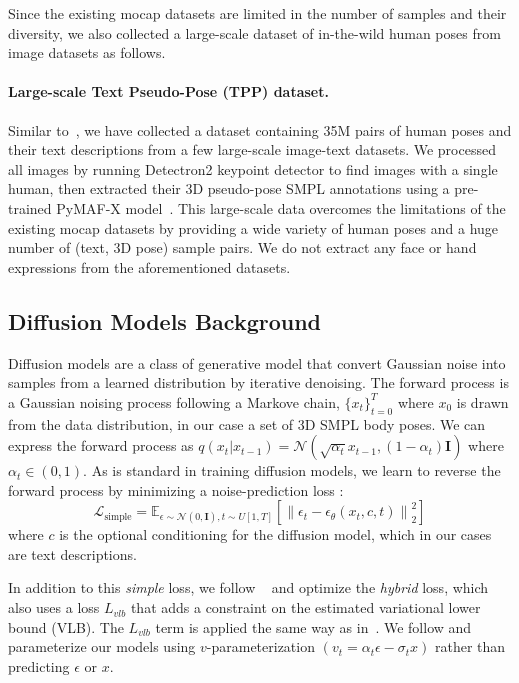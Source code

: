 \documentclass[10pt,twocolumn,letterpaper]{article}
\begin{document}
Since the existing mocap datasets are limited in the number of samples and their diversity, we also collected a large-scale dataset of in-the-wild human poses from image datasets as follows. 
\paragraph{Large-scale Text Pseudo-Pose (TPP) dataset.} Similar to~\cite{azadi2023text}, we have collected a dataset containing 35M pairs of human poses and their text descriptions from a few large-scale image-text datasets. We processed all images by running Detectron2 keypoint detector to find images with a single human, then extracted their 3D pseudo-pose SMPL annotations using a
pre-trained PyMAF-X model~\cite{pymafx}. This large-scale data overcomes the limitations of the existing mocap datasets by
providing a wide variety of human poses and a huge number of
(text, 3D pose) sample pairs. We do not extract any face or hand expressions from the aforementioned datasets.



\subsection{Diffusion Models Background}
Diffusion models are a class of generative model that convert Gaussian noise into samples from a learned distribution by iterative denoising. The forward process is a Gaussian noising process following a Markove chain, $\{x_t\}_{t=0}^T$ where $x_0$ is drawn from the data distribution, in our case a set of 3D SMPL body poses. We can express the forward process as 
$q(x_t | x_{t-1}) = \mathcal{N}(\sqrt{\alpha_t}x_{t-1},(1-\alpha_t)\mathbf{I})$ where $\alpha_t \in (0,1)$. As is standard in training diffusion models, we learn to reverse the forward process by minimizing a noise-prediction loss \cite{ddpms}:
 \begin{equation}
    \mathcal{L}_{\textrm{simple}} = \mathbb{E}_{\epsilon\sim\mathcal{N}(0, \mathbf{I}),t\sim U[1,T]}\left[\left\|\epsilon_t-\epsilon_\theta(x_t, c, t)\right\|_2^2\right]
\label{eqn: loss}
\end{equation}
where $c$ is the optional conditioning for the diffusion model, which in our cases are text descriptions.

In addition to this {\textit{simple}} loss, we follow ~\cite{nichol2021improved,ramesh2022dalle2} and optimize the {\textit{hybrid}} loss, which also uses a loss $L_{vlb}$ that adds a constraint on the estimated variational lower bound (VLB). The $L_{vlb}$ term is applied the same way as in~\cite{nichol2021improved}. We follow \cite{ImagenVid, progdistill} and parameterize our models using $v$-parameterization $(v_t = \alpha_t \epsilon -\sigma_t x)$ rather than predicting $\epsilon$ or $x$.
\end{document}
